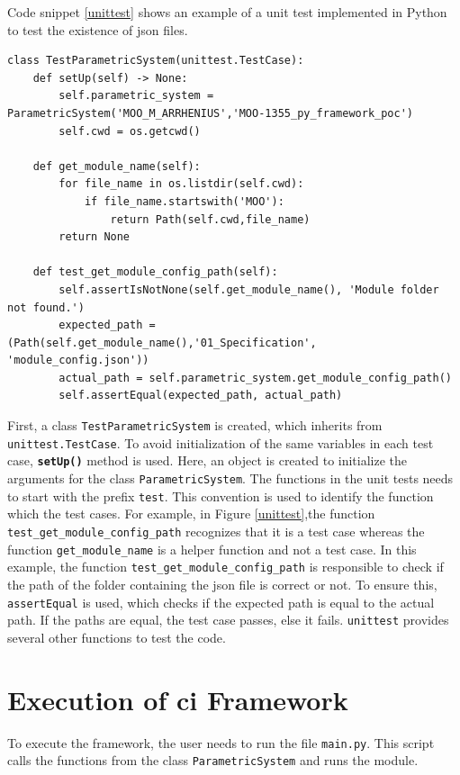 Code snippet \ref{unittest} shows an example of a unit test implemented in Python to test the existence of \acrshort{json} files. 
\renewcommand{\lstlistingname}{Code}
\begin{lstlisting}[style=pythoncode, caption={Example of a unit test}, label={unittest}]
class TestParametricSystem(unittest.TestCase):
    def setUp(self) -> None:
        self.parametric_system = ParametricSystem('MOO_M_ARRHENIUS','MOO-1355_py_framework_poc')
        self.cwd = os.getcwd()

    def get_module_name(self):
        for file_name in os.listdir(self.cwd):
            if file_name.startswith('MOO'):
                return Path(self.cwd,file_name)
        return None

    def test_get_module_config_path(self):
        self.assertIsNotNone(self.get_module_name(), 'Module folder not found.')
        expected_path = (Path(self.get_module_name(),'01_Specification', 'module_config.json'))
        actual_path = self.parametric_system.get_module_config_path()
        self.assertEqual(expected_path, actual_path)  
\end{lstlisting}

First, a class \texttt{TestParametricSystem} is created, which inherits from \texttt{unittest.TestCase}. To avoid initialization of the same variables in each
test case, \textbf{\texttt{setUp()}} method is used. Here, an object is created to initialize the arguments for the class \texttt{ParametricSystem}.
The functions in the unit tests needs to start with the prefix \texttt{test}. This convention is used to identify the function which the test cases. For example, 
in Figure \ref{unittest},the function \texttt{test\_get\_module\_config\_path} recognizes that it is a test case whereas the function \texttt{get\_module\_name}
is a helper function and not a test case. In this example, the function \texttt{test\_get\_module\_config\_path} is responsible to check if the path of the folder
containing the \acrshort{json} file is correct or not. To ensure this, \texttt{assertEqual} is used, which checks if the expected path is equal to the 
actual path. If the paths are equal, the test case passes, else it fails. \texttt{unittest} provides several other functions to test the code. 

\section{Execution of \acrshort{ci} Framework}
To execute the framework, the user needs to run the file \texttt{main.py}. This script calls the functions
from the class \texttt{ParametricSystem} and runs the module.


